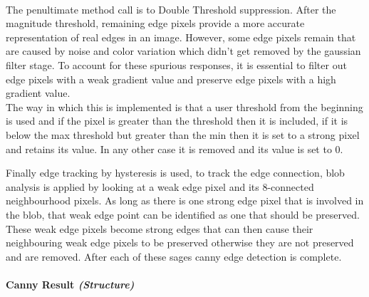 \begin{FlushLeft}
\begin{itemize}
    \end{itemize}
    
    \\ \bk

    The penultimate method call is to Double Threshold suppression. After the magnitude threshold, remaining edge pixels provide a more accurate representation of real edges in an image. However, some edge pixels remain that are caused by noise and color variation which didn't get removed by the gaussian filter stage. To account for these spurious responses, it is essential to filter out edge pixels with a weak gradient value and preserve edge pixels with a high gradient value. \\

    The way in which this is implemented is that a user threshold from the beginning is used and if the pixel is greater than the threshold then it is included, if it is below the max threshold but greater than the min then it is set to a strong pixel and retains its value. In any other case it is removed and its value is set to 0. \\ \bk

    Finally edge tracking by hysteresis is used, to track the edge connection, blob analysis is applied by looking at a weak edge pixel and its 8-connected neighbourhood pixels. As long as there is one strong edge pixel that is involved in the blob, that weak edge point can be identified as one that should be preserved. These weak edge pixels become strong edges that can then cause their neighbouring weak edge pixels to be preserved otherwise they are not preserved and are removed. After each of these sages canny edge detection is complete. \\ \bk    
    \bk


    \paragraph{Canny Result \textit{(Structure)}} \mbox{} \\

    \begin{figure}[H]
        \centering
    \end{figure}\\


\end{FlushLeft}
